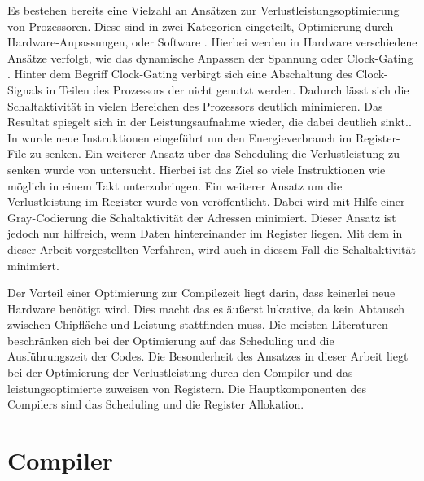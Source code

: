 Es bestehen bereits eine Vielzahl an Ansätzen zur Verlustleistungsoptimierung von Prozessoren. Diese sind in zwei Kategorien eingeteilt, Optimierung durch Hardware-Anpassungen\cite{wu2000clock, horowitz1994low, hajj1998architectural}, oder Software \cite{gebotys1997low, asanovic2000energy, toburen1998instruction, su1995cache }. Hierbei werden in Hardware verschiedene Ansätze verfolgt, wie das dynamische Anpassen der Spannung \cite{horowitz1994low} oder Clock-Gating \cite{wu2000clock}. Hinter dem Begriff Clock-Gating verbirgt sich eine Abschaltung des Clock-Signals in Teilen des Prozessors der nicht genutzt werden. Dadurch lässt sich die Schaltaktivität in vielen Bereichen des Prozessors deutlich minimieren. Das Resultat spiegelt sich in der Leistungsaufnahme wieder, die dabei deutlich sinkt.\cite{donno2003clock}. In \cite{asanovic2000energy} wurde neue Instruktionen eingeführt um den Energieverbrauch im Register-File zu senken. Ein weiterer Ansatz über das Scheduling die Verlustleistung zu senken wurde von \cite{toburen1998instruction} untersucht. Hierbei ist das Ziel so viele Instruktionen wie möglich in einem Takt unterzubringen.
Ein weiterer Ansatz um die Verlustleistung im Register wurde von \cite{su1995cache} veröffentlicht. Dabei wird mit Hilfe einer Gray-Codierung die Schaltaktivität der Adressen minimiert. Dieser Ansatz ist jedoch nur hilfreich, wenn Daten hintereinander im Register liegen. Mit dem in dieser Arbeit vorgestellten Verfahren, wird auch in diesem Fall die Schaltaktivität minimiert.

Der Vorteil einer Optimierung zur Compilezeit liegt darin, dass keinerlei neue Hardware benötigt wird. Dies macht das es äußerst lukrative, da kein Abtausch zwischen Chipfläche und Leistung stattfinden muss. Die meisten Literaturen beschränken sich bei der Optimierung auf das Scheduling und die Ausführungszeit der Codes. Die Besonderheit des Ansatzes in dieser Arbeit liegt bei der Optimierung der Verlustleistung durch den Compiler und das leistungsoptimierte zuweisen von Registern. Die Hauptkomponenten des Compilers sind das Scheduling und die Register Allokation.

\section{Compiler}

